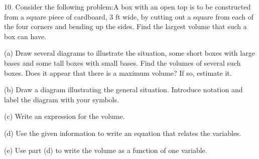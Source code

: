 \documentclass{sebase}
\begin{document}
\begin{multicols}{2}
\begin{ExerciseList}
\item[\hfill 10.] Consider the following problem:\hspace{6pt}A box with an
open top is to be constructed from a square piece of cardboard, $3$ ft wide,
by cutting out a square from each of the four corners and bending up the
sides. Find the largest volume that such a box can have.

\begin{ExerciseList}
\item[(a)] Draw several diagrams to illustrate the situation, some short
boxes with large bases and some tall boxes with small bases. Find the
volumes of several such boxes. Does it appear that there is a maximum
volume? If so, estimate it.

%

\item[(b)] Draw a diagram illustrating the general situation. Introduce
notation and label the diagram with your symbols.

%

\item[(c)] Write an expression for the volume.

%

\item[(d)] Use the given information to write an equation that relates the
variables.

%

\item[(e)] Use part (d) to write the volume as a function of one \linebreak
variable.

%


\end{ExerciseList}
\end{ExerciseList}
\end{multicols}
\end{document}
